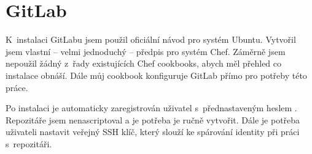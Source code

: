
\section{GitLab}
    K~instalaci GitLabu jsem použil oficiální návod pro systém Ubuntu. Vytvořil jsem vlastní -- velmi jednoduchý -- předpis pro systém Chef. Záměrně jsem nepoužil žádný z~řady existujících Chef cookbooks, abych měl přehled co instalace obnáší. Dále můj cookbook konfiguruje GitLab přímo pro potřeby této práce.

    Po instalaci je automaticky zaregistrován uživatel  s~přednastaveným heslem . Repozitáře jsem nenascriptoval a je potřeba je ručně vytvořit. Dále je potřeba uživateli nastavit veřejný SSH klíč, který slouží ke spárování identity při práci s~repozitáři.

